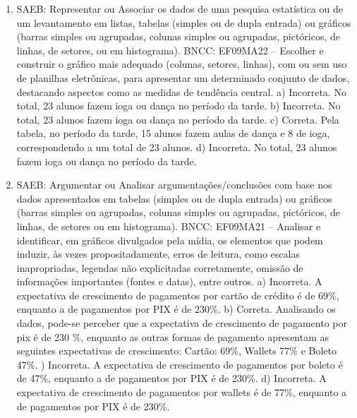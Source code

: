 \begin{enumerate}
\item
SAEB: Representar ou Associar os dados de uma pesquisa estatística ou de um levantamento em listas, tabelas (simples ou de dupla entrada) ou gráficos (barras simples ou agrupadas, colunas simples ou agrupadas, pictóricos, de linhas, de setores, ou em histograma).
BNCC: EF09MA22 -- Escolher e construir o gráfico mais adequado (colunas, setores, linhas), com ou sem uso de planilhas eletrônicas, para apresentar um determinado conjunto de dados, destacando aspectos como as medidas de tendência central.
a) Incorreta. No total, 23 alunos fazem ioga ou dança no período da tarde.   
b) Incorreta. No total, 23 alunos fazem ioga ou dança no período da tarde.   
c) Correta. Pela tabela, no período da tarde, 15 alunos fazem aulas de dança e 8
de ioga, correspondendo a um total de 23 alunos.
d) Incorreta. No total, 23 alunos fazem ioga ou dança no período da tarde.

\item
SAEB: Argumentar ou Analisar argumentações/conclusões com base nos dados apresentados em tabelas (simples ou de dupla entrada) ou gráficos (barras simples ou agrupadas, colunas simples ou agrupadas, pictóricos, de linhas, de setores ou em histograma).
BNCC: EF09MA21 -- Analisar e identificar, em gráficos divulgados pela mídia, os elementos que podem induzir, às vezes propositadamente, erros de leitura, como escalas inapropriadas, legendas não explicitadas corretamente, omissão de informações importantes (fontes e datas), entre outros.
a) Incorreta. A expectativa de crescimento de pagamentos por cartão de crédito é de 69\%, 
enquanto a de pagamentos por PIX é de 230\%.
b) Correta. Analisando os dados, pode-se perceber que a expectativa de crescimento de
pagamento por pix é de 230 \%, enquanto as outras formas de pagamento apresentam
as seguintes expectativas de crescimento: Cartão: 69\%, Wallets 77\% e Boleto 47\%.
) Incorreta. A expectativa de crescimento de pagamentos por boleto é de 47\%, enquanto
a de pagamentos por PIX é de 230\%.
d) Incorreta. A expectativa de crescimento de pagamentos por wallets é de 77\%, enquanto
a de pagamentos por PIX é de 230\%.


\end{enumerate}
